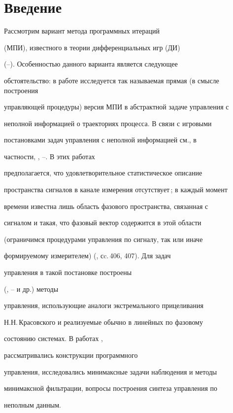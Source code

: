 \section{Введение}





Рассмотрим вариант метода программных итераций


(МПИ), известного в теории дифференциальных игр (ДИ)


(\cite{1}--\cite{9}). Особенностью данного варианта является следующее


обстоятельство: в работе исследуется так называемая прямая (в смысле построения


управляющей процедуры) версия МПИ в абстрактной задаче управления с


неполной информацией о траекториях процесса. В связи с игровыми


постановками задач управления с неполной информацией см., в


частности, \cite{3}, \cite{10}--\cite{12}. В этих работах


предполагается, что удовлетворительное статистическое описание


пространства сигналов в канале измерения отсутствует\,; в каждый момент


времени известна лишь область фазового пространства, связанная с


сигналом и такая, что фазовый вектор содержится в этой области


(ограничимся процедурами управления по сигналу, так или иначе


формируемому измерителем) (\cite{3}, сc.\,406, 407). Для задач


управления в такой постановке построены


(\cite{3}, \cite{10}--\cite{10'} и др.) методы


управления, использующие аналоги экстремального прицеливания


Н.Н.\,Красовского и реализуемые обычно в линейных по фазовому


состоянию системах. В работах \cite{10}, \cite{10'}


рассматривались конструкции программного


управления, исследовались минимаксные задачи наблюдения и методы


минимаксной фильтрации, вопросы построения синтеза управления по


неполным данным.





